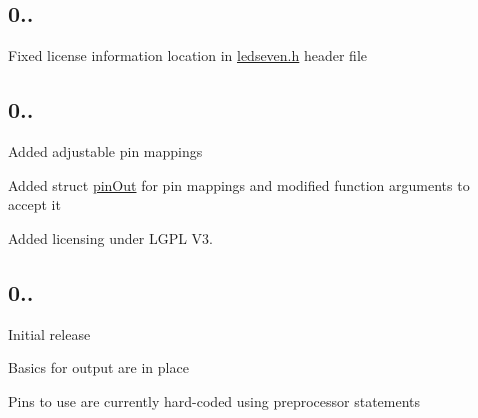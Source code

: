 \subsection*{0..}


\begin{DoxyItemize}
\item Fixed license information location in \hyperlink{ledseven_8h}{ledseven.\+h} header file
\end{DoxyItemize}

\subsection*{0..}


\begin{DoxyItemize}
\item Added adjustable pin mappings
\item Added struct {\ttfamily \hyperlink{structpin_out}{pin\+Out}} for pin mappings and modified function arguments to accept it
\item Added licensing under L\+G\+P\+L V3.
\end{DoxyItemize}

\subsection*{0..}


\begin{DoxyItemize}
\item Initial release
\item Basics for output are in place
\item Pins to use are currently hard-\/coded using preprocessor statements 
\end{DoxyItemize}